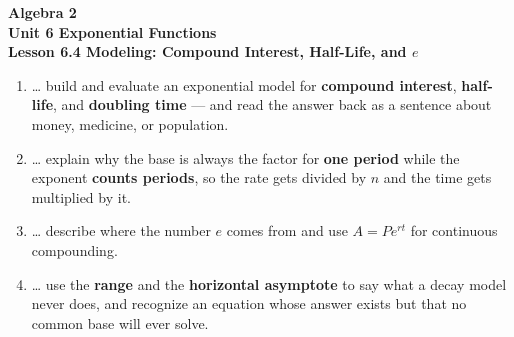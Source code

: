 \documentclass[10pt]{article}
\begin{document}
\vspace{-0.8in}

\begin{center}
  {\color{white}\textbf{\LARGE Algebra 2}}\\[4pt]
  {\color{forestmid}\large\textbf{Unit 6 \quad Exponential Functions}}\\[6pt]
  {\color{white}\textbf{\large Lesson 6.4 \quad Modeling: Compound Interest, Half-Life, and $e$}}
\end{center}

\vspace{0.22in}
\namedateperiod
\vspace{0.18in}

\begin{learningtargetbox}
\small
\begin{enumerate}[leftmargin=1.5em, itemsep=5pt]
  \item \ldots{} build and evaluate an exponential model for \textbf{compound interest}, \textbf{half-life}, and \textbf{doubling time} --- and read the answer back as a sentence about money, medicine, or population.
  \item \ldots{} explain why the base is always the factor for \textbf{one period} while the exponent \textbf{counts periods}, so the rate gets divided by $n$ and the time gets multiplied by it.
  \item \ldots{} describe where the number $e$ comes from and use $A=Pe^{rt}$ for continuous compounding.
  \item \ldots{} use the \textbf{range} and the \textbf{horizontal asymptote} to say what a decay model never does, and recognize an equation whose answer exists but that no common base will ever solve.
\end{enumerate}
\end{learningtargetbox}

\vspace{0.14in}
\end{document}
